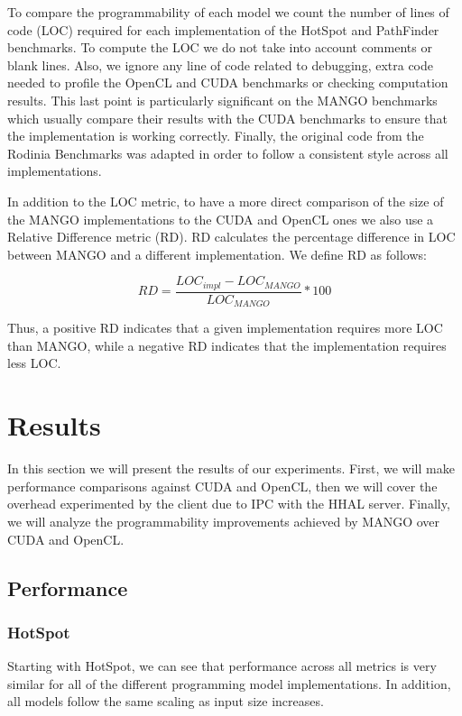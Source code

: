 To compare the programmability of each model we count the number of lines of code (LOC) required for each implementation of the HotSpot and PathFinder benchmarks. To compute the LOC we do not take into account comments or blank lines. Also, we ignore any line of code related to debugging, extra code needed to profile the OpenCL and CUDA benchmarks or checking computation results. This last point is particularly significant on the MANGO benchmarks which usually compare their results with the CUDA benchmarks to ensure that the implementation is working correctly. Finally, the original code from the Rodinia Benchmarks was adapted in order to follow a consistent style across all implementations. 

In addition to the LOC metric, to have a more direct comparison of the size of the MANGO implementations to the CUDA and OpenCL ones we also use a Relative Difference metric (RD). RD calculates the percentage difference in LOC between MANGO and a different implementation. We define RD as follows:

\[
    RD = \frac{LOC_{impl} - LOC_{MANGO}}{LOC_{MANGO}} * 100
\]

Thus, a positive RD indicates that a given implementation requires more LOC than MANGO, while a negative RD indicates that the implementation requires less LOC.

\section{Results}

In this section we will present the results of our experiments. First, we will make performance comparisons against CUDA and OpenCL, then we will cover the overhead experimented by the client due to IPC with the HHAL server. Finally, we will analyze the programmability improvements achieved by MANGO over CUDA and OpenCL.

\subsection{Performance}

\subsubsection{HotSpot}

Starting with HotSpot, we can see that performance across all metrics is very similar for all of the different programming model implementations. In addition, all models follow the same scaling as input size increases. 

